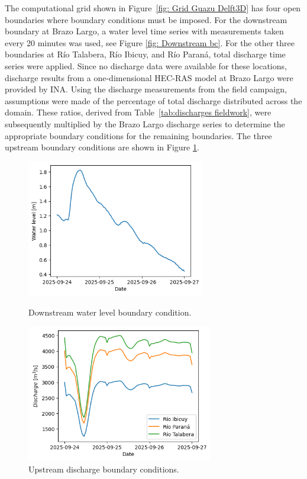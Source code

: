 The computational grid shown in Figure~\ref{fig: Grid Guazu Delft3D} has four open boundaries where boundary conditions must be imposed. For the downstream boundary at Brazo Largo, a water level time series with measurements taken every 20 minutes was used, see Figure \ref{fig: Downstream bc}. For the other three boundaries at Río Talabera, Río Ibicuy, and Río Paraná, total discharge time series were applied. Since no discharge data were available for these locations, discharge results from a one-dimensional HEC-RAS model at Brazo Largo were provided by INA. Using the discharge measurements from the field campaign, assumptions were made of the percentage of total discharge distributed across the domain. These ratios, derived from Table~\ref{tab:discharges fieldwork}, were subsequently multiplied by the Brazo Largo discharge series to determine the appropriate boundary conditions for the remaining boundaries. The three upstream boundary conditions are shown in Figure \ref{fig: Upstream bc}.

\begin{figure}[H]
    \centering
    \begin{minipage}[t]{0.48\linewidth}
        \centering
        \includegraphics[height=6cm]{figures/ch7/Downstream_bc.png}
        \caption{Downstream water level boundary condition.}
        \label{fig: Downstream bc}
    \end{minipage}
    \hfill
    \begin{minipage}[t]{0.48\linewidth}
        \centering
        \includegraphics[height=6cm]{figures/ch7/Upstream_bc.png}
        \caption{Upstream discharge boundary conditions.}
        \label{fig: Upstream bc}
    \end{minipage}
\end{figure}

